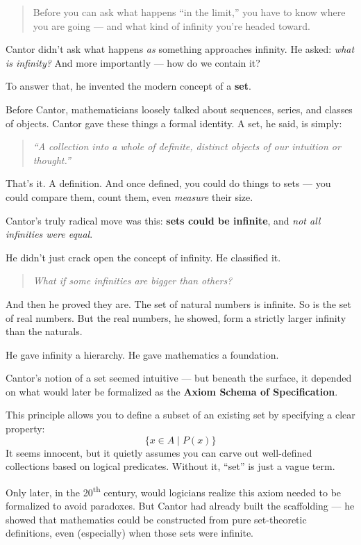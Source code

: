\begin{quote}
Before you can ask what happens “in the limit,” you have to know where you are going — and what kind of infinity you’re headed toward.
\end{quote}

Cantor didn’t ask what happens \textit{as} something approaches infinity.  He asked: \textit{what is infinity?} And more importantly — how do we contain it?

To answer that, he invented the modern concept of a \textbf{set}.

Before Cantor, mathematicians loosely talked about sequences, series, and classes of objects. Cantor gave these things a formal identity. A set, he said, is simply:

\begin{quote}
    \textit{“A collection into a whole of definite, distinct objects of our intuition or thought.”}
\end{quote}

That’s it. A definition. And once defined, you could do things to sets — you could compare them, count them, even \textit{measure} their size.

Cantor’s truly radical move was this: \textbf{sets could be infinite}, and \textit{not all infinities were equal}.

He didn’t just crack open the concept of infinity. He classified it.

\begin{quote}
    \textit{What if some infinities are bigger than others?}
\end{quote}

And then he proved they are. The set of natural numbers is infinite. So is the set of real numbers. But the real numbers, he showed, form a strictly larger infinity than the naturals.

He gave infinity a hierarchy. He gave mathematics a foundation.

\begin{tcolorbox}[colback=gray!5!white, colframe=black, title=\textbf{Historical Sidenote: The Birth of Sets (and a Quiet Axiom)}, fonttitle=\bfseries, arc=1.5mm, boxrule=0.4pt]

Cantor’s notion of a set seemed intuitive — but beneath the surface, it depended on what would later be formalized as the \textbf{Axiom Schema of Specification}.

This principle allows you to define a subset of an existing set by specifying a clear property:  
\[
\{ x \in A \mid P(x) \}
\]
It seems innocent, but it quietly assumes you can carve out well-defined collections based on logical predicates. Without it, “set” is just a vague term.

Only later, in the 20\textsuperscript{th} century, would logicians realize this axiom needed to be formalized to avoid paradoxes. But Cantor had already built the scaffolding — he showed that mathematics could be constructed from pure set-theoretic definitions, even (especially) when those sets were infinite.
\end{tcolorbox}



